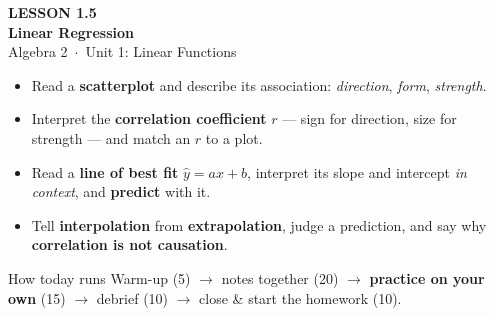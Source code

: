 \documentclass[aspectratio=169, 11pt]{beamer}
\begin{document}
{
\begin{frame}[plain]
  \vspace{2.8cm}\hspace{0.55cm}%
  \begin{minipage}{0.9\textwidth}
    {\color{goldacc}\bfseries\small LESSON 1.5}\\[0.5cm]
    {\color{white}\bfseries\LARGE Linear Regression}\\[1.2cm]
    {\color{forestmid}\small Algebra 2~$\cdot$~Unit 1: Linear Functions}
  \end{minipage}
\end{frame}
}

\begin{frame}[t, plain]
  \begin{itemize}\setlength{\itemsep}{6pt}
    \item Read a \textbf{scatterplot} and describe its association: \emph{direction},
          \emph{form}, \emph{strength}.
    \item Interpret the \textbf{correlation coefficient} $r$ --- sign for direction, size for
          strength --- and match an $r$ to a plot.
    \item Read a \textbf{line of best fit} $\hat y=ax+b$, interpret its slope and intercept
          \emph{in context}, and \textbf{predict} with it.
    \item Tell \textbf{interpolation} from \textbf{extrapolation}, judge a prediction, and say
          why \textbf{correlation is not causation}.
  \end{itemize}
  \vspace{4pt}
  \begin{block}{How today runs}
    Warm-up (5) $\to$ notes together (20) $\to$ \textbf{practice on your own} (15) $\to$ debrief
    (10) $\to$ close \& start the homework (10).
  \end{block}
\end{frame}
\end{document}
